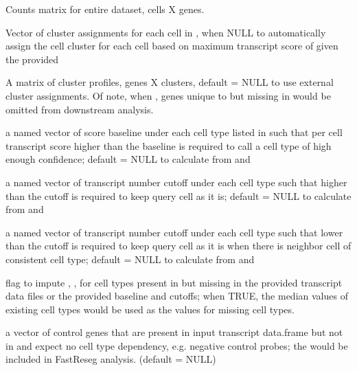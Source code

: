 \documentclass[letterpaper]{book}
\begin{document}
\begin{Arguments}
\begin{ldescription}
\item[\code{counts}] Counts matrix for entire dataset, cells X genes.

\item[\code{clust}] Vector of cluster assignments for each cell in , when NULL to automatically assign the cell cluster for each cell based on maximum transcript score of given the provided 

\item[\code{refProfiles}] A matrix of cluster profiles, genes X clusters, default = NULL to use external cluster assignments.
Of note, when , genes unique to  but missing in  would be omitted from downstream analysis.

\item[\code{score\_baseline}] a named vector of score baseline under each cell type listed in  such that  per cell transcript score higher than the baseline is required to call a cell type of high enough confidence; default = NULL to calculate from  and 

\item[\code{lowerCutoff\_transNum}] a named vector of transcript number cutoff under each cell type such that higher than the cutoff is required to keep query cell as it is; default = NULL to calculate from  and 

\item[\code{higherCutoff\_transNum}] a named vector of transcript number cutoff under each cell type such that lower than the cutoff is required to keep query cell as it is when there is neighbor cell of consistent cell type; default = NULL to calculate from  and 

\item[\code{imputeFlag\_missingCTs}] flag to impute , , for cell types present in  but missing in the provided transcript data files or the provided baseline and cutoffs; when TRUE, the median values of existing cell types would be used as the values for missing cell types.

\item[\code{ctrl\_genes}] a vector of control genes that are present in input transcript data.frame but not in  and expect no cell type dependency, e.g. negative control probes; the  would be included in FastReseg analysis. (default = NULL)


\end{ldescription}
\end{Arguments}
\end{document}
